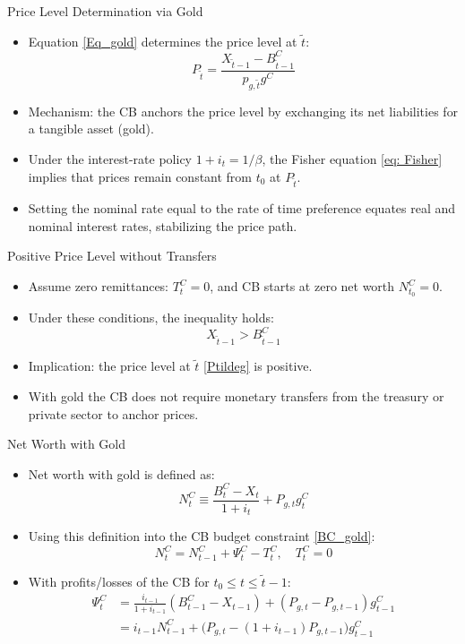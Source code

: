 \documentclass[11pt,aspectratio=169]{beamer}
\begin{document}
\begin{frame}{Price Level Determination via Gold}
\begin{itemize}
    \item Equation \eqref{Eq_gold} determines the price level at $\tilde{t}$:
    \begin{equation}
        P_{\tilde{t}} = \frac{X_{\tilde{t}-1} - B_{\tilde{t}-1}^C}{p_{g,\tilde{t}} g^C}
        \label{Ptildeg}
    \end{equation}
    \item Mechanism: the CB anchors the price level by exchanging its net liabilities for a tangible asset (gold).  
    \item Under the interest-rate policy $1+i_t = 1/\beta$, the Fisher equation \eqref{eq: Fisher} implies that prices remain constant from $t_0$ at $P_{\tilde{t}}$.  
    \item Setting the nominal rate equal to the rate of time preference equates real and nominal interest rates, stabilizing the price path.  
\end{itemize}
\end{frame}

\begin{frame}{Positive Price Level without Transfers}
\begin{itemize}
    \item Assume zero remittances: $T_t^C = 0$, and CB starts at zero net worth $N_{t_0}^C = 0$.
    \item Under these conditions, the inequality holds:
    \[
        X_{\tilde{t}-1} > B_{\tilde{t}-1}^C
    \]
    \item Implication: the price level at $\tilde{t}$ \eqref{Ptildeg} is positive.
    \item With gold the CB does not require monetary transfers from the treasury or private sector to anchor prices.
\end{itemize}
\end{frame}

\begin{frame}{Net Worth with Gold}
\begin{itemize}
    \item Net worth with gold is defined as:
    \[
    N_t^C \equiv\frac{B_t^C-X_t}{1+i_t}+P_{g,t}g_t^C
    \]
    \item Using this definition into the CB budget constraint \eqref{BC_gold}:
    \[
        N_t^C = N_{t-1}^C + \Psi_t^C - T_t^C, \quad T_t^C = 0
    \]  
    \item With profits/losses of the CB for $t_0 \le t \le \tilde{t}-1$:
    \begin{align}
        \Psi_t^C &= \frac{i_{t-1}}{1+i_{t-1}} (B_{t-1}^C - X_{t-1}) + (P_{g,t} - P_{g,t-1}) g_{t-1}^C \\
        &= i_{t-1} N_{t-1}^C + \big(P_{g,t} - (1+i_{t-1}) P_{g,t-1}\big) g_{t-1}^C
    \end{align}
\end{itemize}
\end{frame}
\end{document}
